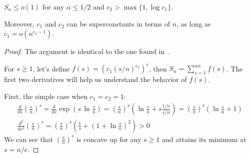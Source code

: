 \begin{proposition}
    \label{pro:bound-prob-large-sets}
    $S_n\leq o(1)$ for any $\alpha\leq 1/2$ and $c_2>\max\{1,\log c_1\}$.
    
    Moreover, $c_1$ and $c_2$ can be superconstants in terms of $n$,
    as long as $c_1=o\left(n^{c_2-1}\right)$.
\end{proposition}

\begin{proof}
    The argument is identical to the one found in~\cite{gms03}.
    
    For $s\geq1$, let's define $f(s)=\left(c_1(s/n)^{c_2}\right)^s$, then
    $S_n=\sum_{s=1}^{\alpha n}{f(s)}$.
    The first two derivatives will help us understand the behavior of $f(s)$.
    
    First, the simple case when $c_1=c_2=1$:
    \begin{gather*}
        \frac{d}{ds}\left(\frac{s}{n}\right)^s
        =\frac{d}{ds}\exp\left(s\,\ln\frac{s}{n}\right)
        =\left(\frac{s}{n}\right)^s\left(\ln\frac{s}{n}+s\frac{1/n}{s/n}\right)
        =\left(\frac{s}{n}\right)^s\left(\ln\frac{s}{n}+1\right)\\
        \frac{d^2}{ds^2}\left(\frac{s}{n}\right)^s
        =\left(\frac{s}{n}\right)^s\left(\frac{1}{s}+\left(1+\ln\frac{s}{n}\right)^2\right)>0
    \end{gather*}
    We can see that $\left(\frac{s}{n}\right)^s$ is concave up for any $s\geq1$
    and attains its minimum at $s=n/e$.
    

\end{proof}
